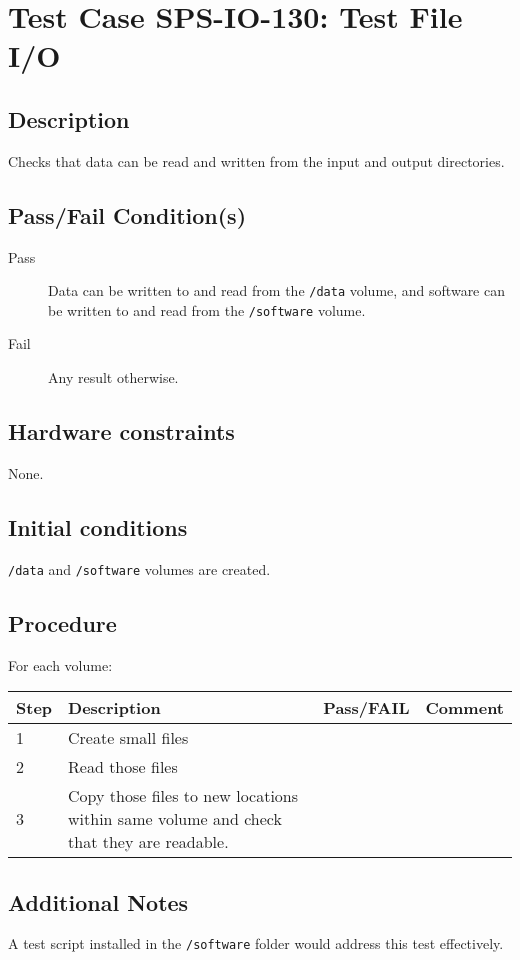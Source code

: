 \section{Test Case SPS-IO-130: Test File I/O}

\subsection{Description}

Checks that data can be read and written from the input and output directories.

\subsection{Pass/Fail Condition(s)}

\begin{description}
\item [Pass] Data can be written to and read from the \texttt{/data} volume,
and software can be written to and read from the \texttt{/software} volume.
\item [Fail] Any result otherwise.
\end{description}

\subsection{Hardware constraints}

None.

\subsection{Initial conditions}

\texttt{/data} and \texttt{/software} volumes are created.

\subsection{Procedure}

For each volume:

\begin{table}[H]
    \begin{tabular}{|l| p{5cm} |l| p{5cm} |}
    \hline
    {\bf Step} & {\bf Description} & {\bf Pass/FAIL} & {\bf Comment}  \\ \hline
    1 & Create small files &  &  \\ \hline
    2 & Read those files &  &  \\ \hline
    3 & Copy those files to new locations within same volume and check that they are readable. &  &  \\ \hline
    \end{tabular}
\end{table}


\subsection{Additional Notes}

A test script installed in the \texttt{/software} folder would address this test effectively.
